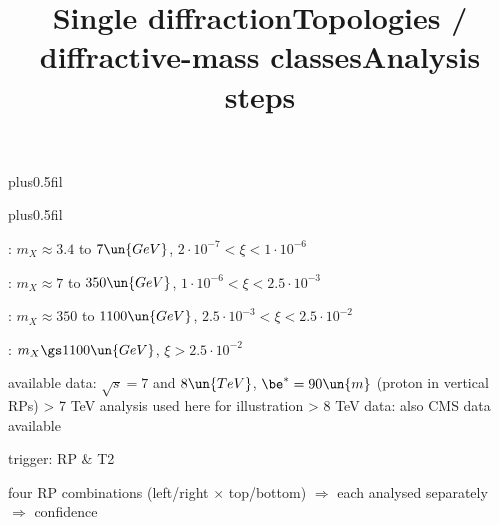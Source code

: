 \newpage %
\hbox{}
\vfil
\title{Single diffraction}

\vskip0pt plus0.5fil

\vskip0pt plus0.5fil

\vfil
{}

\newpage %
\title{Topologies / diffractive-mass classes}

\vskip-5mm

\> : $m_X \approx 3.4$ to $7\un{GeV}$, $2\cdot10^{-7} < \xi < 1\cdot 10^{-6}$


\> : $m_X \approx 7$ to $350\un{GeV}$, $1\cdot10^{-6} < \xi < 2.5\cdot 10^{-3}$


\> : $m_X \approx 350$ to $1100\un{GeV}$, $2.5\cdot10^{-3} < \xi < 2.5\cdot 10^{-2}$


\> : $m_X \gs 1100\un{GeV}$, $\xi > 2.5\cdot 10^{-2}$


\newpage %
\title{Analysis steps}

\> available data: $\sqrt s = 7$ and $8\un{TeV}$, $\be^* = 90\un{m}$ (proton in vertical RPs)
\>> 7 TeV analysis used here for illustration
\>> 8 TeV data: also CMS data available

\> trigger: RP \& T2

\> four RP combinations (left/right $\times$ top/bottom) $\Rightarrow$ each analysed separately $\Rightarrow$ confidence

